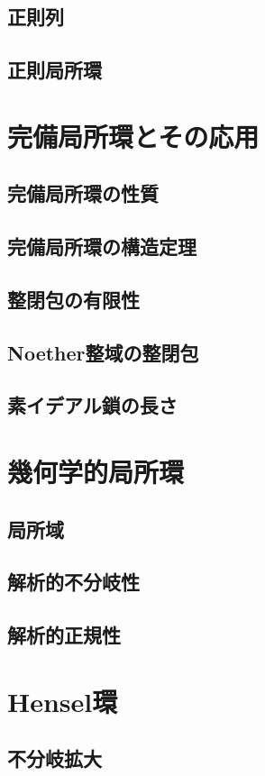 \documentclass[uplatex]{jsarticle}
\theoremstyle{definition}
\begin{document}
\subsection{正則列}
\subsection{正則局所環}

\section{完備局所環とその応用}
\subsection{完備局所環の性質}
\subsection{完備局所環の構造定理}
\subsection{整閉包の有限性}
\subsection{Noether整域の整閉包}
\subsection{素イデアル鎖の長さ}

\section{幾何学的局所環}
\subsection{局所域}
\subsection{解析的不分岐性}
\subsection{解析的正規性}

\section{Hensel環}
\subsection{不分岐拡大}
\end{document}
